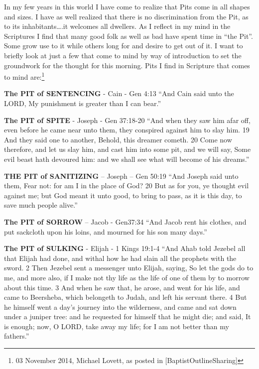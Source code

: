 In my few years in this world I have come to realize that Pits come in all shapes and sizes. I have as well realized that there is no discrimination from the Pit, as to its inhabitants….it welcomes all dwellers. As I reflect in my mind in the Scriptures I find that many good folk as well as bad have spent time in “the Pit”. Some grow use to it while others long for and desire to get out of it. I want to briefly look at just a few that come to mind by way of introduction to set the groundwork for the thought for this morning. Pits I find in Scripture that comes to mind are:\footnote{03 November 2014, Michael Lovett, as posted in [BaptistOutlineSharing] }
\begin{compactenum}[I.][9]
    \item \textbf{The PIT of SENTENCING} - Cain - Gen 4:13 ``And Cain said unto the LORD, My punishment is greater than I can bear.''
    \item \textbf{The PIT of SPITE} - Joseph - Gen 37:18-20 ``And when they saw him afar off, even before he came near unto them, they conspired against him to slay him. 19 And they said one to another, Behold, this dreamer cometh. 20 Come now therefore, and let us slay him, and cast him into some pit, and we will say, Some evil beast hath devoured him: and we shall see what will become of his dreams.''
    \item \textbf{THE PIT of SANITIZING} – Joseph – Gen 50:19 ``And Joseph said unto them, Fear not: for am I in the place of God? 20 But as for you, ye thought evil against me; but God meant it unto good, to bring to pass, as it is this day, to save much people alive.''
    \item \textbf{The PIT of SORROW} – Jacob - Gen37:34 ``And Jacob rent his clothes, and put sackcloth upon his loins, and mourned for his son many days.''
    \item \textbf{The PIT of SULKING} - Elijah - 1 Kings 19:1-4 ``And Ahab told Jezebel all that Elijah had done, and withal how he had slain all the prophets with the sword. 2 Then Jezebel sent a messenger unto Elijah, saying, So let the gods do to me, and more also, if I make not thy life as the life of one of them by to morrow about this time. 3 And when he saw that, he arose, and went for his life, and came to Beersheba, which belongeth to Judah, and left his servant there. 4 But he himself went a day's journey into the wilderness, and came and sat down under a juniper tree: and he requested for himself that he might die; and said, It is enough; now, O LORD, take away my life; for I am not better than my fathers.'' 

\end{compactenum}
